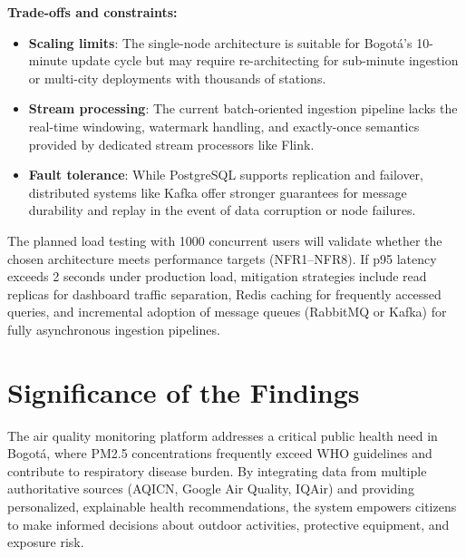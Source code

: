 \textbf{Trade-offs and constraints:}
\begin{itemize}
    \item \textbf{Scaling limits}: The single-node architecture is suitable for Bogotá's 10-minute update cycle but may require re-architecting for sub-minute ingestion or multi-city deployments with thousands of stations.
    \item \textbf{Stream processing}: The current batch-oriented ingestion pipeline lacks the real-time windowing, watermark handling, and exactly-once semantics provided by dedicated stream processors like Flink.
    \item \textbf{Fault tolerance}: While PostgreSQL supports replication and failover, distributed systems like Kafka offer stronger guarantees for message durability and replay in the event of data corruption or node failures.
\end{itemize}

The planned load testing with 1000 concurrent users will validate whether the chosen architecture meets performance targets (NFR1--NFR8). If p95 latency exceeds 2 seconds under production load, mitigation strategies include read replicas for dashboard traffic separation, Redis caching for frequently accessed queries, and incremental adoption of message queues (RabbitMQ or Kafka) for fully asynchronous ingestion pipelines.

\section{Significance of the Findings}
\label{sec:significance}

The air quality monitoring platform addresses a critical public health need in Bogotá, where PM2.5 concentrations frequently exceed WHO guidelines and contribute to respiratory disease burden. By integrating data from multiple authoritative sources (AQICN, Google Air Quality, IQAir) and providing personalized, explainable health recommendations, the system empowers citizens to make informed decisions about outdoor activities, protective equipment, and exposure risk.

